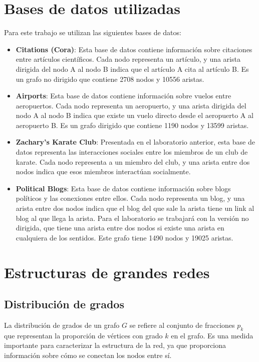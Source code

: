 \documentclass{article}
\begin{document}
\section{Bases de datos utilizadas} \label{sec: datasets}
Para este trabajo se utilizan las siguientes bases de datos:
\begin{itemize}
    \item \textbf{Citations (Cora)}: Esta base de datos contiene información sobre citaciones entre artículos científicos. Cada nodo representa un artículo, y una arista dirigida del nodo A al nodo B indica que el artículo A cita al artículo B. Es un grafo no dirigido que contiene 2708 nodos y 10556 aristas.
    \item \textbf{Airports}: Esta base de datos contiene información sobre vuelos entre aeropuertos. Cada nodo representa un aeropuerto, y una arista dirigida del nodo A al nodo B indica que existe un vuelo directo desde el aeropuerto A al aeropuerto B. Es un grafo dirigido que contiene 1190 nodos y 13599 aristas.
    \item \textbf{Zachary's Karate Club}: Presentada en el laboratorio anterior, esta base de datos representa las interacciones sociales entre los miembros de un club de karate. Cada nodo representa a un miembro del club, y una arista entre dos nodos indica que esos miembros interactúan socialmente.
    \item \textbf{Political Blogs}: Esta base de datos contiene información sobre blogs políticos y las conexiones entre ellos. Cada nodo representa un blog, y una arista entre dos nodos indica que el blog del que sale la arista tiene un link al blog al que llega la arista. Para el laboratorio se trabajará con la versión no dirigida, que tiene una arista entre dos nodos si existe una arista en cualquiera de los sentidos. Este grafo tiene 1490 nodos y 19025 aristas.
\end{itemize}


\section{Estructuras de grandes redes} \label{sec: estructuras}

\subsection{Distribución de grados}


La distribución de grados de un grafo $G$ se refiere al conjunto de fracciones $p_k$ que representan la proporción de vértices con grado $k$ en el grafo. Es una medida importante para caracterizar la estructura de la red, ya que proporciona información sobre cómo se conectan los nodos entre sí.
\end{document}
